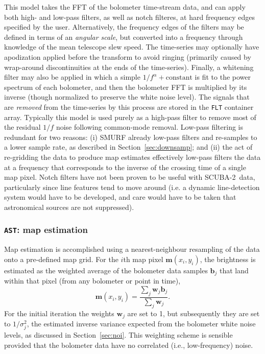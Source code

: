\documentclass[useAMS,usenatbib,nofootinbib]{mn2e}
\newcommand{\scuba}{SCUBA-2}
\newcommand{\model}[1]{\texttt{#1}}
\begin{document}
This model takes the FFT of the bolometer time-stream data, and can
apply both high- and low-pass filters, as well as notch filteres, at
hard frequency edges specified by the user. Alternatively, the
frequency edges of the filters may be defined in terms of an
\emph{angular scale}, but converted into a frequency through knowledge
of the mean telescope slew speed. The time-series may optionally have
apodization applied before the transform to avoid ringing (primarily
caused by wrap-around discontinuities at the ends of the
time-series). Finally, a whitening filter may also be applied in which
a simple $1/f^\alpha + \mathrm{constant}$ is fit to the power spectrum
of each bolometer, and then the bolometer FFT is multiplied by its
inverse (though normalized to preserve the white noise level).  The
signals that are \emph{removed} from the time-series by this process
are stored in the \model{FLT} container array. Typically this model is
used purely as a high-pass filter to remove most of the residual $1/f$
noise following common-mode removal. Low-pass filtering is redundant
for two reasons: (i) SMURF already low-pass filters and re-samples to
a lower sample rate, as described in Section~\ref{sec:downsamp}; and
(ii) the act of re-gridding the data to produce map estimates
effectively low-pass filters the data at a frequency that corresponds
to the inverse of the crossing time of a single map pixel. Notch
filters have not been proven to be useful with \scuba\ data,
particularly since line features tend to move around (i.e. a dynamic
line-detection system would have to be developed, and care would have
to be taken that astronomical sources are not suppressed).

\subsubsection{\model{AST}: map estimation}
\label{sec:ast}

Map estimation is accomplished using a nearest-neighbour resampling of
the data onto a pre-defined map grid. For the $i$th map pixel
$\mathbf{m}(x_i,y_i)$, the brightness is estimated as the weighted
average of the bolometer data samples $\mathbf{b}_j$ that land within
that pixel (from any bolometer or point in time),
%
\begin{equation}
  \mathbf{m}(x_i,y_i) = \frac{\sum_j \mathbf{w}_j \mathbf{b}_j }
                             { \sum_j \mathbf{w}_j } .
\end{equation}
%
For the initial iteration the weights $\mathbf{w}_j$ are set to 1, but
subsequently they are set to $1/\sigma_j^2$, the estimated inverse
variance expected from the bolometer white noise levels, as discussed
in Section~\ref{sec:noi}. This weighting scheme is sensible provided
that the bolometer data have no correlated (i.e., low-frequency)
noise.
\end{document}
